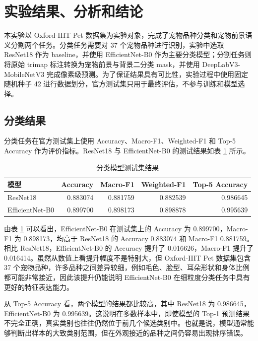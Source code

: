 \documentclass[UTF8,a4paper,12pt]{ctexart}
\begin{document}
\section{实验结果、分析和结论}

本实验以 Oxford-IIIT Pet 数据集为实验对象，完成了宠物品种分类和宠物前景语义分割两个任务。分类任务需要对 37 个宠物品种进行识别，实验中选取 ResNet18 作为 baseline，并使用 EfficientNet-B0 作为主要分类模型；分割任务则将原始 trimap 标注转换为宠物前景与背景二分类 mask，并使用 DeepLabV3-MobileNetV3 完成像素级预测。为了保证结果具有可比性，实验过程中使用固定随机种子 42 进行数据划分，官方测试集只用于最终评估，不参与训练和模型选择。

\subsection{分类结果}

分类任务在官方测试集上使用 Accuracy、Macro-F1、Weighted-F1 和 Top-5 Accuracy 作为评价指标。ResNet18 与 EfficientNet-B0 的测试结果如表 \ref{tab:cls-results} 所示。

\begin{table}[H]
\centering
\caption{分类模型测试集结果}
\label{tab:cls-results}
\begin{tabular}{lrrrr}
\toprule
模型 & Accuracy & Macro-F1 & Weighted-F1 & Top-5 Accuracy \\
\midrule
ResNet18 & 0.883074 & 0.881759 & 0.882539 & 0.986645 \\
EfficientNet-B0 & 0.899700 & 0.898173 & 0.898878 & 0.995639 \\
\bottomrule
\end{tabular}
\end{table}

由表 \ref{tab:cls-results} 可以看出，EfficientNet-B0 在测试集上的 Accuracy 为 0.899700，Macro-F1 为 0.898173，均高于 ResNet18 的 Accuracy 0.883074 和 Macro-F1 0.881759。相比 ResNet18，EfficientNet-B0 的 Accuracy 提升了 0.016626，Macro-F1 提升了 0.016414。虽然从数值上看提升幅度不是特别大，但 Oxford-IIIT Pet 数据集包含 37 个宠物品种，许多品种之间差异较细，例如毛色、脸型、耳朵形状和身体比例都可能非常接近，因此该提升仍能说明 EfficientNet-B0 在细粒度分类任务中具有更好的特征表达能力。

从 Top-5 Accuracy 看，两个模型的结果都比较高，其中 ResNet18 为 0.986645，EfficientNet-B0 为 0.995639。这说明在多数样本中，即使模型的 Top-1 预测结果不完全正确，真实类别也往往仍然位于前几个候选类别中。也就是说，模型通常能够判断出样本的大致类别范围，但在外观接近的品种之间仍容易出现排序错误。
\end{document}
